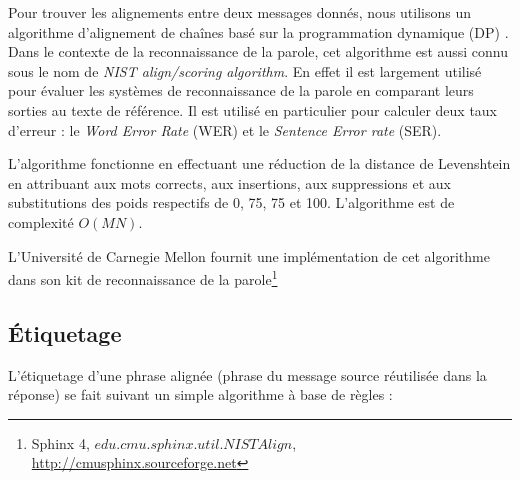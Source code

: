 \label{subsec:alignment}

Pour trouver les alignements entre deux messages donnés, nous utilisons un algorithme d'alignement de chaînes basé sur la programmation dynamique (DP) \cite{sankoff:1983}. Dans le contexte de la reconnaissance de la parole, cet algorithme est aussi connu sous le nom de \textit{NIST align/scoring algorithm}. En effet il est largement utilisé pour évaluer les systèmes de reconnaissance de la parole en comparant leurs sorties au texte de référence. Il est utilisé en particulier pour calculer deux taux d'erreur : le \textit{Word Error Rate} (WER) et le \textit{Sentence Error rate} (SER).

L'algorithme fonctionne en effectuant une réduction de la distance de Levenshtein en attribuant aux mots corrects, aux insertions, aux suppressions et aux substitutions des poids respectifs de 0, 75, 75 et 100. L'algorithme est de complexité $O(MN)$.

L'Université de Carnegie Mellon fournit une implémentation de cet algorithme dans son kit de reconnaissance de la parole\footnote{Sphinx 4, $edu.cmu.sphinx.util.NISTAlign$, \url{http://cmusphinx.sourceforge.net}}

\subsection{Étiquetage}

\label{subsec:labelling}

L'étiquetage d'une phrase alignée (phrase du message source réutilisée dans la réponse) se fait suivant un simple algorithme à base de règles :


